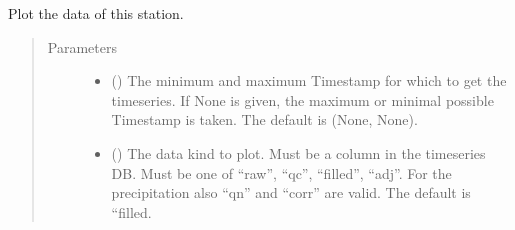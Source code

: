 \documentclass[letterpaper,10pt,english]{sphinxmanual}
\begin{document}
\begin{fulllineitems}
\begin{fulllineitems}
\label{\detokenize{weatherDB:weatherDB.station.StationBase.plot}}
\sphinxAtStartPar
Plot the data of this station.
\begin{quote}\begin{description}
\item[{Parameters}] \leavevmode\begin{itemize}
\item {} 
\sphinxAtStartPar
{} ({\hyperref[\detokenize{weatherDB.lib:weatherDB.lib.utils.TimestampPeriod}]{}}\sphinxstyleliteralemphasis{\sphinxupquote{(}}\sphinxstyleliteralemphasis{\sphinxupquote{)}}\sphinxstyleliteralemphasis{\sphinxupquote{, }}) \textendash{} The minimum and maximum Timestamp for which to get the timeseries.
If None is given, the maximum or minimal possible Timestamp is taken.
The default is (None, None).

\item {} 
\sphinxAtStartPar
{} (\sphinxstyleliteralemphasis{\sphinxupquote{, }}) \textendash{} The data kind to plot.
Must be a column in the timeseries DB.
Must be one of “raw”, “qc”, “filled”, “adj”.
For the precipitation also “qn” and “corr” are valid.
The default is “filled.

\end{itemize}

\end{description}\end{quote}

\end{fulllineitems}



\end{fulllineitems}
\end{document}
